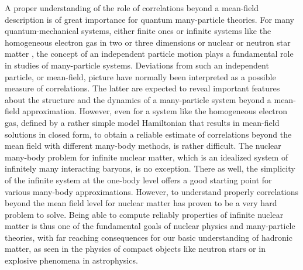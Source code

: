 A proper understanding of the role of correlations beyond a mean-field
description is of great importance for quantum many-particle theories.
For many quantum-mechanical systems, either finite ones or infinite
systems like the homogeneous electron gas in two or three dimensions
\cite{ceperley1980,tanatar1989,shepherd2012a} or nuclear or neutron star matter 
\cite{day1967,shapiro,walecka,weber1999,hh2000},  
the concept of an independent particle motion plays a fundamental role
in studies of many-particle systems.  Deviations from such an
independent particle, or mean-field, picture have normally been
interpreted as a possible measure of correlations.  The latter are
expected to reveal important features about the structure and the
dynamics of a many-particle system beyond a mean-field
approximation. However, even for a system like the homogeneous
electron gas, defined by a rather simple model Hamiltonian that
results in mean-field solutions in closed form, to obtain a reliable
estimate of correlations beyond the mean field with different
many-body methods, is rather difficult.  The nuclear many-body problem
for infinite nuclear matter, which is an idealized 
system of infinitely many interacting baryons, is no exception. There
as well, the simplicity of the infinite system at the one-body level
offers a good starting point for various many-body
approximations. However, to understand properly correlations beyond
the mean field level for nuclear matter has proven to be a very hard
problem to solve. Being able to compute reliably properties of
infinite nuclear matter is thus one of the fundamental goals of
nuclear physics and many-particle theories, with far reaching
consequences for our basic understanding of hadronic matter, as seen
in the physics of compact objects like neutron stars or in explosive
phenomena in astrophysics.






